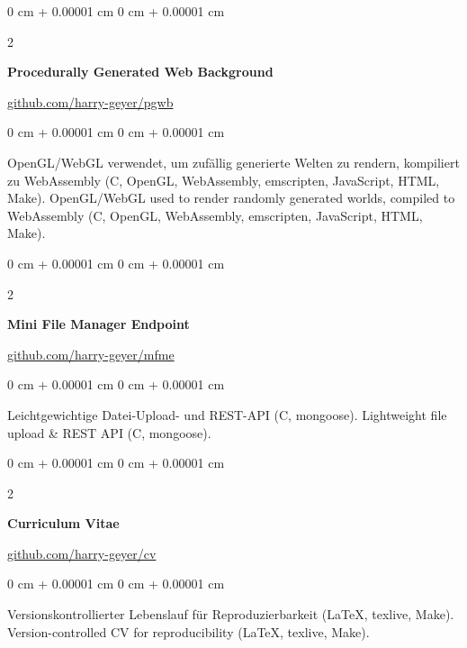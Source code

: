 \documentclass[10pt, letterpaper]{article}
\newenvironment{onecolentry}{
    \begin{adjustwidth}{
        0 cm + 0.00001 cm
    }{
        0 cm + 0.00001 cm
    }
}{
    \end{adjustwidth}
}
\newenvironment{twocolentry}[2][]{
    \onecolentry
    \def\secondColumn{#2}
    \setcolumnwidth{\fill, 4.75 cm}
    \begin{paracol}{2}
}{
    \switchcolumn \raggedleft \secondColumn
    \end{paracol}
    \endonecolentry
}
\begin{document}
        \vspace{0.2 cm}

        \begin{twocolentry}{\href{https://github.com/harry-geyer/pgwb}{github.com/harry-geyer/pgwb}}
            \textbf{Procedurally Generated Web Background}
        \end{twocolentry}

        \vspace{0.10 cm}
        \begin{onecolentry}
            \ifdefined\german
            OpenGL/WebGL verwendet, um zufällig generierte Welten zu rendern, kompiliert zu WebAssembly (C, OpenGL, WebAssembly, emscripten, JavaScript, HTML, Make).
            \else
            OpenGL/WebGL used to render randomly generated worlds, compiled to WebAssembly (C, OpenGL, WebAssembly, emscripten, JavaScript, HTML, Make).
            \fi
        \end{onecolentry}

        \vspace{0.2 cm}

        \begin{twocolentry}{\href{https://github.com/harry-geyer/mfme}{github.com/harry-geyer/mfme}}
            \textbf{Mini File Manager Endpoint}
        \end{twocolentry}
        
        \vspace{0.10 cm}
        \begin{onecolentry}
            \ifdefined\german
            Leichtgewichtige Datei-Upload- und REST-API (C, mongoose).
            \else
            Lightweight file upload \& REST API (C, mongoose).
            \fi
        \end{onecolentry}
        
        \vspace{0.2 cm}

        \begin{twocolentry}{\href{https://github.com/harry-geyer/cv}{github.com/harry-geyer/cv}}
            \textbf{Curriculum Vitae}
        \end{twocolentry}

        \vspace{0.10 cm}
        \begin{onecolentry}
            \ifdefined\german
            Versionskontrollierter Lebenslauf für Reproduzierbarkeit (LaTeX, texlive, Make).
            \else
            Version-controlled CV for reproducibility (LaTeX, texlive, Make).
            \fi
        \end{onecolentry}
\end{document}
